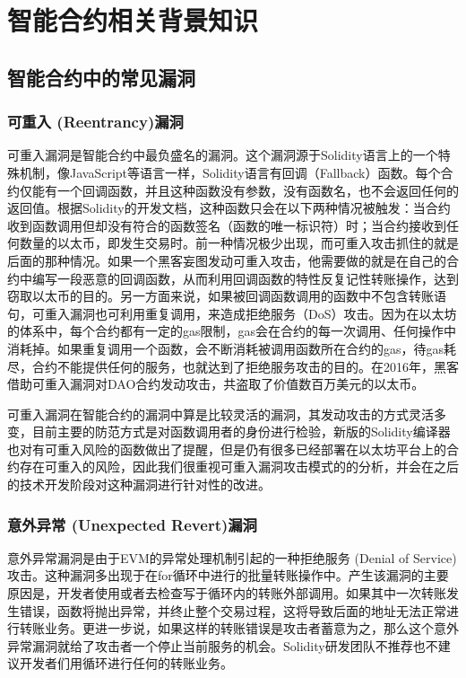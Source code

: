 
\chapter{智能合约相关背景知识}

\section{智能合约中的常见漏洞}

\subsection{可重入 (Reentrancy)漏洞}

可重入漏洞是智能合约中最负盛名的漏洞。这个漏洞源于Solidity语言上的一个特殊机制，像JavaScript等语言一样，Solidity语言有回调（Fallback）函数。每个合约仅能有一个回调函数，并且这种函数没有参数，没有函数名，也不会返回任何的返回值。根据Solidity的开发文档，这种函数只会在以下两种情况被触发：当合约收到函数调用但却没有符合的函数签名（函数的唯一标识符）时；当合约接收到任何数量的以太币，即发生交易时。前一种情况极少出现，而可重入攻击抓住的就是后面的那种情况。如果一个黑客妄图发动可重入攻击，他需要做的就是在自己的合约中编写一段恶意的回调函数，从而利用回调函数的特性反复记性转账操作，达到窃取以太币的目的。另一方面来说，如果被回调函数调用的函数中不包含转账语句，可重入漏洞也可利用重复调用，来造成拒绝服务（DoS）攻击。因为在以太坊的体系中，每个合约都有一定的gas限制，gas会在合约的每一次调用、任何操作中消耗掉。如果重复调用一个函数，会不断消耗被调用函数所在合约的gas，待gas耗尽，合约不能提供任何的服务，也就达到了拒绝服务攻击的目的。在2016年，黑客借助可重入漏洞对DAO合约发动攻击，共盗取了价值数百万美元的以太币。

可重入漏洞在智能合约的漏洞中算是比较灵活的漏洞，其发动攻击的方式灵活多变，目前主要的防范方式是对函数调用者的身份进行检验，新版的Solidity编译器也对有可重入风险的函数做出了提醒，但是仍有很多已经部署在以太坊平台上的合约存在可重入的风险，因此我们很重视可重入漏洞攻击模式的的分析，并会在之后的技术开发阶段对这种漏洞进行针对性的改进。

\subsection{意外异常 (Unexpected Revert)漏洞}

意外异常漏洞是由于EVM的异常处理机制引起的一种拒绝服务 (Denial of Service) 攻击。这种漏洞多出现于在for循环中进行的批量转账操作中。产生该漏洞的主要原因是，开发者使用或者去检查写于循环内的转账外部调用。如果其中一次转账发生错误，函数将抛出异常，并终止整个交易过程，这将导致后面的地址无法正常进行转账业务。更进一步说，如果这样的转账错误是攻击者蓄意为之，那么这个意外异常漏洞就给了攻击者一个停止当前服务的机会。Solidity研发团队不推荐也不建议开发者们用循环进行任何的转账业务。


